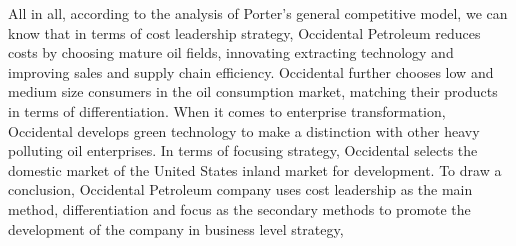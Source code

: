\documentclass[
	a4paper, %
	12pt,%
]{CSSullivanBusinessReport}
\begin{document}
\begin{fullwidth}
All in all, according to the analysis of Porter's general competitive model, we can know that in terms of cost leadership strategy, Occidental Petroleum reduces costs by choosing mature oil fields, innovating extracting technology and improving sales and supply chain efficiency. Occidental further chooses low and medium size consumers in the oil consumption market, matching their products in terms of differentiation. When it comes to enterprise transformation, Occidental develops green technology to make a distinction with other heavy polluting oil enterprises. In terms of focusing strategy, Occidental selects the domestic market of the United States inland market for development. To draw a conclusion, Occidental Petroleum company uses cost leadership as the main method, differentiation and focus as the secondary methods to promote the development of the company in business level strategy,


\end{fullwidth}
\end{document}
